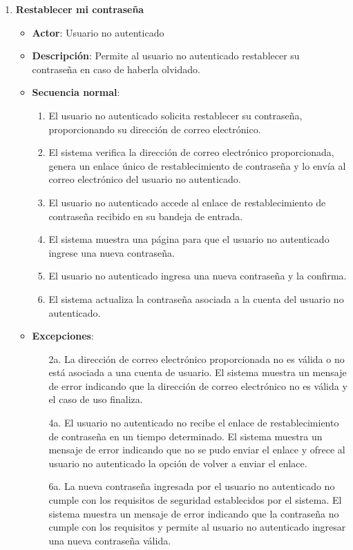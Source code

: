 \begin{enumerate}[label=UC-\protect\twodigits{\arabic*}:, align=left, leftmargin=*]
\item \textbf{Restablecer mi contraseña}
\begin{itemize}
\item \textbf{Actor}: Usuario no autenticado
\item \textbf{Descripción}: Permite al usuario no autenticado restablecer su contraseña en caso de haberla olvidado.
\item \textbf{Secuencia normal}:
\begin{enumerate}[label={\arabic*}:]
\item El usuario no autenticado solicita restablecer su contraseña, proporcionando su dirección de correo electrónico.
\item El sistema verifica la dirección de correo electrónico proporcionada, genera un enlace único de restablecimiento de contraseña y lo envía al correo electrónico del usuario no autenticado.
\item El usuario no autenticado accede al enlace de restablecimiento de contraseña recibido en su bandeja de entrada.
\item El sistema muestra una página para que el usuario no autenticado ingrese una nueva contraseña.
\item El usuario no autenticado ingresa una nueva contraseña y la confirma.
\item El sistema actualiza la contraseña asociada a la cuenta del usuario no autenticado.
\end{enumerate}
\item \textbf{Excepciones}:
\begin{itemize}
\item[2a.] La dirección de correo electrónico proporcionada no es válida o no está asociada a una cuenta de usuario. El sistema muestra un mensaje de error indicando que la dirección de correo electrónico no es válida y el caso de uso finaliza.
\item[4a.] El usuario no autenticado no recibe el enlace de restablecimiento de contraseña en un tiempo determinado. El sistema muestra un mensaje de error indicando que no se pudo enviar el enlace y ofrece al usuario no autenticado la opción de volver a enviar el enlace.
\item[6a.] La nueva contraseña ingresada por el usuario no autenticado no cumple con los requisitos de seguridad establecidos por el sistema. El sistema muestra un mensaje de error indicando que la contraseña no cumple con los requisitos y permite al usuario no autenticado ingresar una nueva contraseña válida.
\end{itemize}
\end{itemize}


\end{enumerate}
